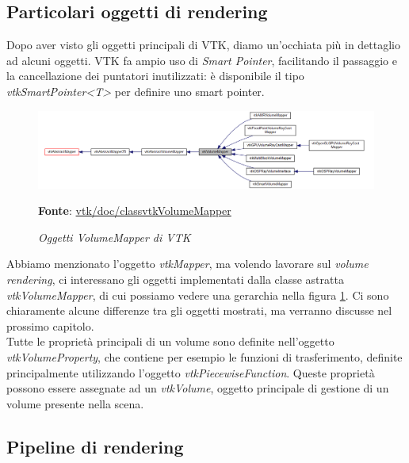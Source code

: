 \subsection{Particolari oggetti di rendering}\label{sec:special-rendering}
Dopo aver visto gli oggetti principali di VTK, diamo un'occhiata più in dettaglio ad alcuni oggetti. VTK fa ampio uso di \emph{Smart Pointer}, facilitando il passaggio e la cancellazione dei puntatori inutilizzati: è disponibile il tipo \emph{vtkSmartPointer<T>} per definire uno smart pointer.

\begin{figure}[h]
    \centering
    \includegraphics[scale=0.4]{immagini/volumerendering/mappers.png}
    \caption{\textit{Oggetti VolumeMapper di VTK}}
    \textbf{Fonte}: \href{https://vtk.org/doc/nightly/html/classvtkVolumeMapper.html}{vtk/doc/classvtkVolumeMapper}
    \label{fig: Gerarchia di VolumeMapper}
\end{figure}

Abbiamo menzionato l'oggetto \emph{vtkMapper}, ma volendo lavorare sul \emph{volume rendering}, ci interessano gli oggetti implementati dalla classe astratta \emph{vtkVolumeMapper}, di cui possiamo vedere una gerarchia nella figura \ref{fig: Gerarchia di VolumeMapper}. Ci sono chiaramente alcune differenze tra gli oggetti mostrati, ma verranno discusse nel prossimo capitolo.
\\
Tutte le proprietà principali di un volume sono definite nell'oggetto \emph{vtkVolumeProperty}, che contiene per esempio le funzioni di trasferimento, definite principalmente utilizzando l'oggetto \emph{vtkPiecewiseFunction}. Queste proprietà possono essere assegnate ad un \emph{vtkVolume}, oggetto principale di gestione di un volume presente nella scena.

\subsection{Pipeline di rendering}

